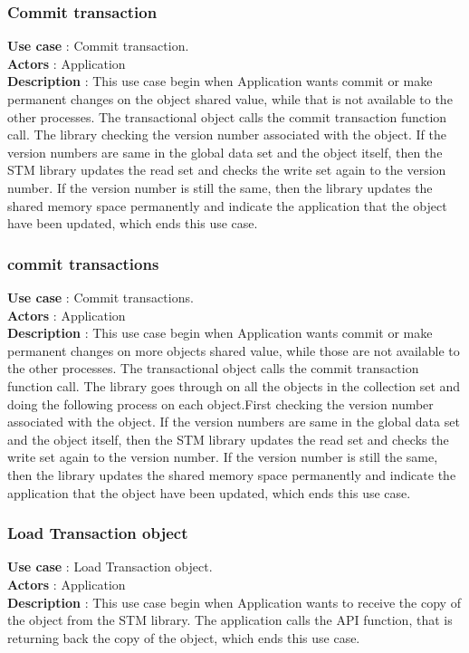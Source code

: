 \documentclass[12pt]{article}
\begin{document}
{\subsubsection{Commit transaction}
\textbf{Use case} : Commit transaction.\\
\textbf{Actors} : Application\\
\textbf{Description} : This use case begin when Application wants commit or make permanent changes on the object shared value, while that is not available to the other processes. The transactional object calls the commit transaction function call. The library checking the version number associated with the object. If the version numbers are same in the global data set and the object itself, then the STM library updates the read set and checks the write set again to the version number. If the version number is still the same, then the library updates the shared memory space permanently and indicate the application that the object have been updated,  which ends this use case.\\ 
\subsubsection{commit transactions}
\textbf{Use case} : Commit transactions.\\
\textbf{Actors} : Application\\
\textbf{Description} : This use case begin when Application wants commit or make permanent changes on more objects shared value, while those are not available to the other processes. The transactional object calls the commit transaction function call. The library goes through on all the objects in the collection set and doing the following process on each object.First checking the version number associated with the object. If the version numbers are same in the global data set and the object itself, then the STM library updates the read set and checks the write set again to the version number. If the version number is still the same, then the library updates the shared memory space permanently and indicate the application that the object have been updated,  which ends this use case.\\
\subsubsection{Load Transaction object}
\textbf{Use case} : Load Transaction object.\\
\textbf{Actors} : Application\\
\textbf{Description} : This use case begin when Application wants to receive the copy of the object from the STM library. The application calls the API function, that is returning back the copy of the object, which ends this use case.\\
}
\end{document}
